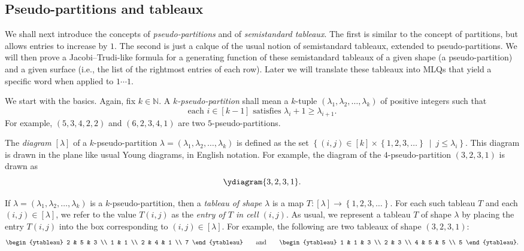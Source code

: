 \documentclass[reqno]{amsart}%
\newcommand{\0}{\phantom{c}}
\newcommand{\ive}[1]{\left[ #1 \right]}
\newcommand{\defn}[1]{{\color{darkred}\emph{#1}}}
\theoremstyle{plain}
\theoremstyle{definition}
\numberwithin{equation}{section}
\begin{document}
\subsection{Pseudo-partitions and tableaux}

We shall next introduce the concepts of \textit{pseudo-partitions} and of
\textit{semistandard tableaux}. The first is similar to the concept of
partitions, but allows entries to increase by $1$. The second is just a calque
of the usual notion of semistandard tableaux, extended to pseudo-partitions.
We will then prove a Jacobi--Trudi-like formula for a generating function of
these semistandard tableaux of a given shape (a pseudo-partition) and a given
surface (i.e., the list of the rightmost entries of each row). Later we will
translate these tableaux into MLQs that yield a specific word when applied to
$1\cdots1$.

We start with the basics. Again, fix $k\in\mathbb{N}$. A
\defn{$k$-pseudo-partition} shall mean a $k$-tuple $\left(  \lambda
_{1},\lambda_{2},\ldots,\lambda_{k}\right)  $ of positive integers such that%
\[
\text{each }i\in\left[  k-1\right]  \text{ satisfies }\lambda_{i}+1\geq
\lambda_{i+1}.
\]
For example, $\left(  5,3,4,2,2\right)  $ and $\left(  6,2,3,4,1\right)  $ are
two $5$-pseudo-partitions.

The \defn{diagram $\ive{\lambda}$} of a $k$-pseudo-partition $\lambda=\left(
\lambda_{1},\lambda_{2},\ldots,\lambda_{k}\right)  $ is defined as the set
$\left\{  \left(  i,j\right)  \in\left[  k\right]  \times\left\{
1,2,3,\ldots\right\}  \ \mid\ j\leq\lambda_{i}\right\}  $. This diagram is
drawn in the plane like usual Young diagrams, in English notation. For
example, the diagram of the $4$-pseudo-partition $\left(  3,2,3,1\right)  $ is
drawn as%
\[
\ydiagram{3,2,3,1}.
\]


If $\lambda=\left(  \lambda_{1},\lambda_{2},\ldots,\lambda_{k}\right)  $ is a
$k$-pseudo-partition, then a \defn{tableau of shape $\lambda$} is a map
$T:\left[  \lambda\right]  \rightarrow\left\{  1,2,3,\ldots\right\}  $. For
each such tableau $T$ and each $\left(  i,j\right)  \in\left[  \lambda\right]
$, we refer to the value $T\left(  i,j\right)  $ as the
\defn{entry of $T$ in cell $\left(i,j\right)$}. As usual, we represent a
tableau $T$ of shape $\lambda$ by placing the entry $T\left(  i,j\right)  $
into the box corresponding to $\left(  i,j\right)  \in\left[  \lambda\right]
$. For example, the following are two tableaux of shape $\left(
3,2,3,1\right)  $:%
\begin{equation}
\begin{ytableau} 2 & 5 & 3 \\ 1 & 1 \\ 2 & 4 & 1 \\ 7 \end{ytableau}\qquad
\text{and}\qquad
\begin{ytableau} 1 & 1 & 3 \\ 2 & 3 \\ 4 & 5 & 5 \\ 5 \end{ytableau}.
\label{eq.tableau.exas}%
\end{equation}
\end{document}
